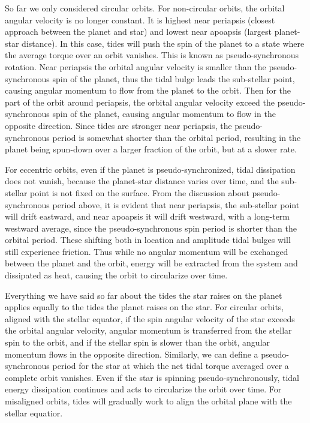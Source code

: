 So far we only considered circular orbits. For non-circular orbits, the orbital
angular velocity is no longer constant. It is highest near periapsis (closest
approach between the planet and star) and lowest near apoapsis (largest
planet-star distance). In this case, tides will push the spin of the planet to a
state where the average torque over an orbit vanishes. This is known as
pseudo-synchronous rotation. Near periapsis the orbital angular velocity is
smaller than the pseudo-synchronous spin of the planet, thus the tidal bulge
leads the sub-stellar point, causing angular momentum to flow from the planet to
the orbit. Then for the part of the orbit around periapsis, the orbital angular
velocity exceed the pseudo-synchronous spin of the planet, causing angular
momentum to flow in the opposite direction. Since tides are stronger near
periapsis, the pseudo-synchronous period is somewhat shorter than the orbital
period, resulting in the planet being spun-down over a larger fraction of the
orbit, but at a slower rate.

For eccentric orbits, even if the planet is pseudo-synchronized, tidal
dissipation does not vanish, because the planet-star distance varies over time,
and the sub-stellar point is not fixed on the surface. From the discussion about
pseudo-synchronous period above, it is evident that near periapsis, the
sub-stellar point will drift eastward, and near apoapsis it will drift westward,
with a long-term westward average, since the pseudo-synchronous spin period is
shorter than the orbital period. These shifting both in location and amplitude
tidal bulges will still experience friction. Thus while no angular momentum will
be exchanged between the planet and the orbit, energy will be extracted from
the system and dissipated as heat, causing the orbit to circularize over time.

Everything we have said so far about the tides the star raises on the planet
applies equally to the tides the planet raises on the star. For circular orbits,
aligned with the stellar equator, if the spin angular velocity of the star
exceeds the orbital angular velocity, angular momentum is transferred from the
stellar spin to the orbit, and if the stellar spin is slower than the orbit,
angular momentum flows in the opposite direction. Similarly, we can define a
pseudo-synchronous period for the star at which the net tidal torque averaged
over a complete orbit vanishes. Even if the star is spinning
pseudo-synchronously, tidal energy dissipation continues and acts to circularize
the orbit over time. For misaligned orbits, tides will gradually work to align
the orbital plane with the stellar equatior.

